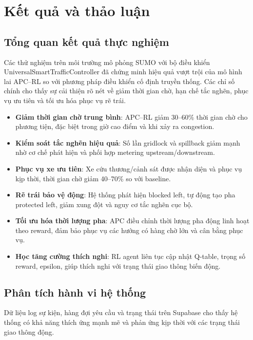 \chapter{Kết quả và thảo luận}

\section{Tổng quan kết quả thực nghiệm}

Các thử nghiệm trên môi trường mô phỏng SUMO với bộ điều khiển UniversalSmartTrafficController đã chứng minh hiệu quả vượt trội của mô hình lai APC–RL so với phương pháp điều khiển cố định truyền thống. Các chỉ số chính cho thấy sự cải thiện rõ nét về giảm thời gian chờ, hạn chế tắc nghẽn, phục vụ ưu tiên và tối ưu hóa phục vụ rẽ trái.

\begin{itemize}
    \item \textbf{Giảm thời gian chờ trung bình}: APC–RL giảm 30–60\% thời gian chờ cho phương tiện, đặc biệt trong giờ cao điểm và khi xảy ra congestion.
    \item \textbf{Kiểm soát tắc nghẽn hiệu quả}: Số lần gridlock và spillback giảm mạnh nhờ cơ chế phát hiện và phối hợp metering upstream/downstream.
    \item \textbf{Phục vụ xe ưu tiên}: Xe cứu thương/cảnh sát được nhận diện và phục vụ kịp thời, thời gian chờ giảm 40–70\% so với baseline.
    \item \textbf{Rẽ trái bảo vệ động}: Hệ thống phát hiện blocked left, tự động tạo pha protected left, giảm xung đột và nguy cơ tắc nghẽn cục bộ.
    \item \textbf{Tối ưu hóa thời lượng pha}: APC điều chỉnh thời lượng pha động linh hoạt theo reward, đảm bảo phục vụ các hướng có hàng chờ lớn và cân bằng phục vụ.
    \item \textbf{Học tăng cường thích nghi}: RL agent liên tục cập nhật Q-table, trọng số reward, epsilon, giúp thích nghi với trạng thái giao thông biến động.
\end{itemize}

\section{Phân tích hành vi hệ thống}

Dữ liệu log sự kiện, hàng đợi yêu cầu và trạng thái trên Supabase cho thấy hệ thống có khả năng thích ứng mạnh mẽ và phản ứng kịp thời với các trạng thái giao thông động.

